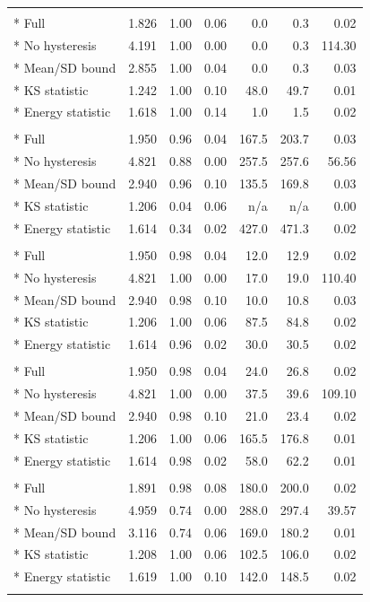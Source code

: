\documentclass[preprint,12pt]{elsarticle}
\begin{document}
\begin{longtable}{lrrrrrr}
\addlinespace
\multicolumn{7}{l}{\textit{F2$\to$F1}}\\*
Full & 1.826 & 1.00 & 0.06 & 0.0 & 0.3 & 0.02\\*
No hysteresis & 4.191 & 1.00 & 0.00 & 0.0 & 0.3 & 114.30\\*
Mean/SD bound & 2.855 & 1.00 & 0.04 & 0.0 & 0.3 & 0.03\\*
KS statistic & 1.242 & 1.00 & 0.10 & 48.0 & 49.7 & 0.01\\*
Energy statistic & 1.618 & 1.00 & 0.14 & 1.0 & 1.5 & 0.02\\
\addlinespace
\multicolumn{7}{l}{\textit{Local abrupt (LEA)}}\\*
Full & 1.950 & 0.96 & 0.04 & 167.5 & 203.7 & 0.03\\*
No hysteresis & 4.821 & 0.88 & 0.00 & 257.5 & 257.6 & 56.56\\*
Mean/SD bound & 2.940 & 0.96 & 0.10 & 135.5 & 169.8 & 0.03\\*
KS statistic & 1.206 & 0.04 & 0.06 & n/a & n/a & 0.00\\*
Energy statistic & 1.614 & 0.34 & 0.02 & 427.0 & 471.3 & 0.02\\
\addlinespace
\multicolumn{7}{l}{\textit{Global abrupt (GSG)}}\\*
Full & 1.950 & 0.98 & 0.04 & 12.0 & 12.9 & 0.02\\*
No hysteresis & 4.821 & 1.00 & 0.00 & 17.0 & 19.0 & 110.40\\*
Mean/SD bound & 2.940 & 0.98 & 0.10 & 10.0 & 10.8 & 0.03\\*
KS statistic & 1.206 & 1.00 & 0.06 & 87.5 & 84.8 & 0.02\\*
Energy statistic & 1.614 & 0.96 & 0.02 & 30.0 & 30.5 & 0.02\\
\addlinespace
\multicolumn{7}{l}{\textit{Transition 500}}\\*
Full & 1.950 & 0.98 & 0.04 & 24.0 & 26.8 & 0.02\\*
No hysteresis & 4.821 & 1.00 & 0.00 & 37.5 & 39.6 & 109.10\\*
Mean/SD bound & 2.940 & 0.98 & 0.10 & 21.0 & 23.4 & 0.02\\*
KS statistic & 1.206 & 1.00 & 0.06 & 165.5 & 176.8 & 0.01\\*
Energy statistic & 1.614 & 0.98 & 0.02 & 58.0 & 62.2 & 0.01\\
\addlinespace
\multicolumn{7}{l}{\textit{Bimodal shift}}\\*
Full & 1.891 & 0.98 & 0.08 & 180.0 & 200.0 & 0.02\\*
No hysteresis & 4.959 & 0.74 & 0.00 & 288.0 & 297.4 & 39.57\\*
Mean/SD bound & 3.116 & 0.74 & 0.06 & 169.0 & 180.2 & 0.01\\*
KS statistic & 1.208 & 1.00 & 0.06 & 102.5 & 106.0 & 0.02\\*
Energy statistic & 1.619 & 1.00 & 0.10 & 142.0 & 148.5 & 0.02\\
\addlinespace
\end{longtable}\endgroup
\end{document}
